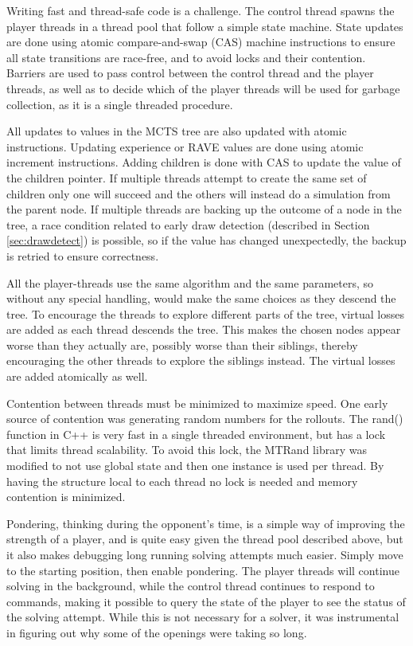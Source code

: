 Writing fast and thread-safe code is a challenge. The control thread spawns the player threads in a thread pool that follow a simple state machine. State updates are done using atomic compare-and-swap (CAS) machine instructions to ensure all state transitions are race-free, and to avoid locks and their contention. Barriers are used to pass control between the control thread and the player threads, as well as to decide which of the player threads will be used for garbage collection, as it is a single threaded procedure.

All updates to values in the MCTS tree are also updated with atomic instructions. Updating experience or RAVE values are done using atomic increment instructions. Adding children is done with CAS to update the value of the children pointer. If multiple threads attempt to create the same set of children only one will succeed and the others will instead do a simulation from the parent node. If multiple threads are backing up the outcome of a node in the tree, a race condition related to early draw detection (described in Section \ref{sec:drawdetect}) is possible, so if the value has changed unexpectedly, the backup is retried to ensure correctness.

All the player-threads use the same algorithm and the same parameters, so without any special handling, would make the same choices as they descend the tree. To encourage the threads to explore different parts of the tree, virtual losses\cite{chaslot2008parallel} are added as each thread descends the tree. This makes the chosen nodes appear worse than they actually are, possibly worse than their siblings, thereby encouraging the other threads to explore the siblings instead. The virtual losses are added atomically as well.

Contention between threads must be minimized to maximize speed. One early source of contention was generating random numbers for the rollouts. The rand() function in C++ is very fast in a single threaded environment, but has a lock that limits thread scalability. To avoid this lock, the MTRand library was modified to not use global state and then one instance is used per thread. By having the structure local to each thread no lock is needed and memory contention is minimized.

Pondering, thinking during the opponent's time, is a simple way of improving the strength of a player, and is quite easy given the thread pool described above, but it also makes debugging long running solving attempts much easier. Simply move to the starting position, then enable pondering. The player threads will continue solving in the background, while the control thread continues to respond to commands, making it possible to query the state of the player to see the status of the solving attempt. While this is not necessary for a solver, it was instrumental in figuring out why some of the openings were taking so long.


